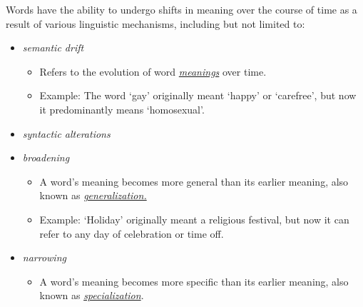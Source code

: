 Words have the ability to undergo shifts in meaning over the course of time as a result of various linguistic mechanisms,
including but not limited to:
\begin{itemize}
    \item \emph{semantic drift} ~\cite{gulordava-baroni-2011-distributional, kim-etal-2014-temporal, kulkarni2014statisticallysignificantdetectionlinguistic}
    \begin{itemize}
        \item Refers to the evolution of word \underline{\emph{meanings}} over time.
        \item Example: The word `gay' originally meant `happy' or `carefree', but now it predominantly means `homosexual'.
    \end{itemize}
    \item \emph{syntactic alterations} ~\cite{kulkarni2014statisticallysignificantdetectionlinguistic, hamilton-etal-2016-cultural, giulianelli-etal-2020-analysing}
    \item \emph{broadening} ~\cite{kulkarni2014statisticallysignificantdetectionlinguistic, hamilton-etal-2016-cultural, giulianelli-etal-2020-analysing}
        \begin{itemize}
            \item A word’s meaning becomes more general than its earlier meaning, also known as \underline{\emph{generalization.}}
            \item Example: `Holiday' originally meant a religious festival, but now it can refer to any day of celebration or time off.
        \end{itemize}
    \item \emph{narrowing} ~\cite{kulkarni2014statisticallysignificantdetectionlinguistic, giulianelli-etal-2020-analysing}
    \begin{itemize}
            \item A word’s meaning becomes more specific than its earlier meaning, also known as \underline{\emph{specialization}}.

\end{itemize}
\end{itemize}
